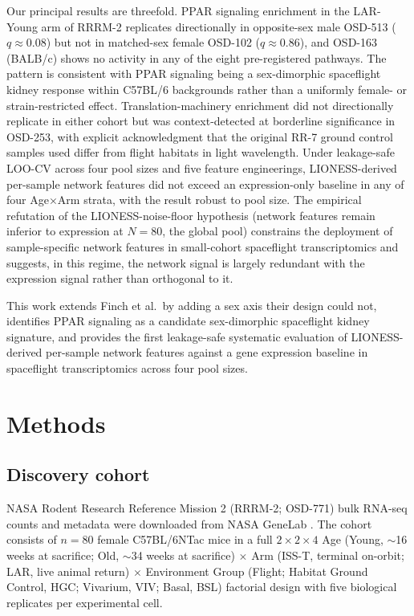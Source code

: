 \documentclass[11pt]{article}
\begin{document}
Our principal results are threefold. PPAR signaling enrichment in the LAR-Young arm of RRRM-2 replicates directionally in opposite-sex male OSD-513 ($q\approx 0.08$) but not in matched-sex female OSD-102 ($q\approx 0.86$), and OSD-163 (BALB/c) shows no activity in any of the eight pre-registered pathways. The pattern is consistent with PPAR signaling being a sex-dimorphic spaceflight kidney response within C57BL/6 backgrounds rather than a uniformly female- or strain-restricted effect. Translation-machinery enrichment did not directionally replicate in either cohort but was context-detected at borderline significance in OSD-253, with explicit acknowledgment that the original RR-7 ground control samples used differ from flight habitats in light wavelength. Under leakage-safe LOO-CV across four pool sizes and five feature engineerings, LIONESS-derived per-sample network features did not exceed an expression-only baseline in any of four Age$\times$Arm strata, with the result robust to pool size. The empirical refutation of the LIONESS-noise-floor hypothesis (network features remain inferior to expression at $N{=}80$, the global pool) constrains the deployment of sample-specific network features in small-cohort spaceflight transcriptomics and suggests, in this regime, the network signal is largely redundant with the expression signal rather than orthogonal to it.

This work extends Finch et al.\ by adding a sex axis their design could not, identifies PPAR signaling as a candidate sex-dimorphic spaceflight kidney signature, and provides the first leakage-safe systematic evaluation of LIONESS-derived per-sample network features against a gene expression baseline in spaceflight transcriptomics across four pool sizes.

\section{Methods}

\subsection{Discovery cohort}

NASA Rodent Research Reference Mission 2 (RRRM-2; OSD-771) bulk RNA-seq counts and metadata were downloaded from NASA GeneLab \citep{ray2019genelab}. The cohort consists of $n{=}80$ female C57BL/6NTac mice in a full $2{\times}2{\times}4$ Age (Young, $\sim$16 weeks at sacrifice; Old, $\sim$34 weeks at sacrifice) $\times$ Arm (ISS-T, terminal on-orbit; LAR, live animal return) $\times$ Environment Group (Flight; Habitat Ground Control, HGC; Vivarium, VIV; Basal, BSL) factorial design with five biological replicates per experimental cell.
\end{document}
